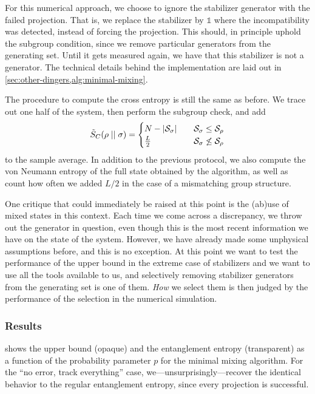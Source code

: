 For this numerical approach, we choose to ignore the stabilizer generator with
the failed projection. That is, we replace the stabilizer by $\mathds{1}$ where
the incompatibility was detected, instead of forcing the projection. This
should, in principle uphold the subgroup condition, since we remove particular
generators from the generating set. Until it gets measured again, we have that
this stabilizer is not a generator. The technical details behind the
implementation are laid out in \cref{sec:other-dingers,alg:minimal-mixing}.

The procedure to compute the cross entropy is still the same as before. We
trace out one half of the system, then perform the subgroup check, and add
\begin{align}\label{eq:cross-ent-cases-infty}
  \tilde{S}_C(\rho\mid\mid\sigma) = \begin{cases}
    N - \abs{\mathcal{S}_\sigma} &\quad{\mathcal{S}_\sigma \leq
    \mathcal{S}_\rho}\\
      \frac{L}{2}  &\quad{\mathcal{S}_\sigma \not\leq \mathcal{S}_\rho}
  \end{cases}
\end{align}
to the sample average. In addition to the previous protocol, we also compute
the von Neumann entropy of the full state obtained by the algorithm, as well as
count how often we added $L /2$ in the case of a mismatching group structure.

One critique that could immediately be raised at this point is the (ab)use of
mixed states in this context. Each time we come across a discrepancy, we
throw out the generator in question, even though this is the most recent
information we have on the state of the system. However, we have already made
some unphysical assumptions before, and this is no exception. At this point we
want to test the performance of the upper bound in the extreme case of
stabilizers and we want to use all the tools available to us, and selectively
removing stabilizer generators from the generating set is one of them.
\emph{How} we select them is then judged by the performance of the selection in
the numerical simulation.

\subsubsection{Results}

 shows the upper bound (opaque) and the
entanglement entropy (transparent) as a function of the probability parameter
$p$ for the minimal mixing algorithm. For the \enquote{no error, track
everything} case, we---unsurprisingly---recover the identical behavior to the
regular entanglement entropy, since every projection is successful. 

